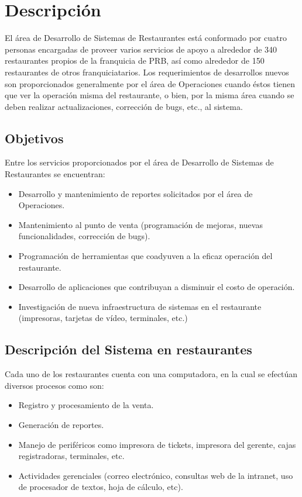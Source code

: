 
\chapter{Descripción}
\label{chap:descripcion}

El área de Desarrollo de Sistemas de Restaurantes está conformado por cuatro personas encargadas de proveer varios servicios de apoyo a alrededor de 340 restaurantes propios de la franquicia de PRB, así como alrededor de 150 restaurantes de otros franquiciatarios. Los requerimientos de desarrollos nuevos son proporcionados generalmente por el área de Operaciones cuando éstos tienen que ver la operación misma del restaurante, o bien, por la misma área cuando se deben realizar actualizaciones, corrección de bugs, etc., al sistema.

\section{Objetivos}
\label{sec:objetivos}

Entre los servicios proporcionados por el área de Desarrollo de Sistemas de Restaurantes se encuentran:

\begin{itemize}
 \item Desarrollo y mantenimiento de reportes solicitados por el área de Operaciones.
 \item Mantenimiento al punto de venta (programación de mejoras, nuevas funcionalidades, corrección de bugs).
 \item Programación de herramientas que coadyuven a la eficaz operación del restaurante.
 \item Desarrollo de aplicaciones que contribuyan a disminuir el costo de operación.
 \item Investigación de nueva infraestructura de sistemas en el restaurante (impresoras, tarjetas de vídeo, terminales, etc.)
\end{itemize}

\section{Descripción del Sistema en restaurantes}
\label{sec:descripcion}

Cada uno de los restaurantes cuenta con una computadora, en la cual se efectúan diversos procesos como son:

\begin{itemize}
 \item Registro y procesamiento de la venta.
 \item Generación de reportes.
 \item Manejo de periféricos como impresora de tickets, impresora del gerente, cajas registradoras, terminales, etc.
 \item Actividades gerenciales (correo electrónico, consultas web de la intranet, uso de procesador de textos, hoja de cálculo, etc).
\end{itemize}

